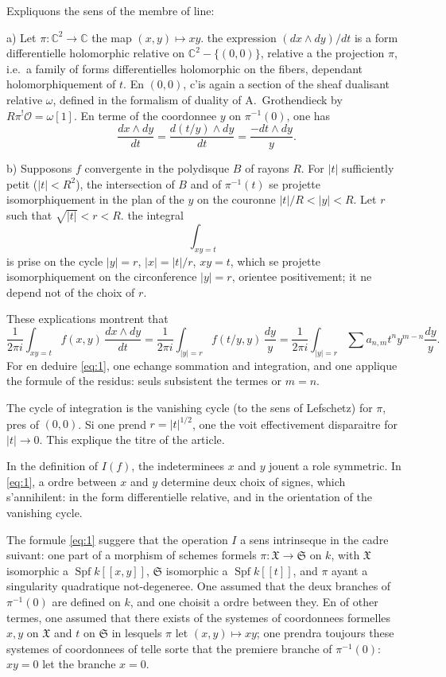 \documentclass[12pt,a4paper]{article}
\theoremstyle{plain}
\theoremstyle{definition}
\theoremstyle{remark}
\DeclareMathOperator{\Spf}{Spf}
\newcommand{\CC}{\mathbb{C}}
\newcommand{\OO}{\mathcal{O}}
\providecommand{\CC}{\mathbb{C}}
\begin{document}
Expliquons the sens of the membre of line:

a) Let $\pi:\CC^2\to\CC$ the map $(x,y)\mapsto xy$. the expression
$(dx\wedge dy)/dt$ is a form differentielle holomorphic relative on
$\CC^2-\{(0,0)\}$, relative a the projection $\pi$, i.e.\ a family of forms
differentielles holomorphic on the fibers, dependant holomorphiquement of $t$.
En $(0,0)$, c'is again a section of the sheaf dualisant relative $\omega$, defined
in the formalism of duality of A.\ Grothendieck by
$R\pi^!\OO=\omega[1]$. En terme of the coordonnee $y$ on $\pi^{-1}(0)$, one has
\[
\frac{dx\wedge dy}{dt}=\frac{d(t/y)\wedge dy}{dt}=\frac{-dt\wedge dy}{y}.
\]

b) Supposons $f$ convergente in the polydisque $B$ of rayons $R$. For $|t|$
sufficiently petit ($|t|<R^2$), the intersection of $B$ and of $\pi^{-1}(t)$ se projette
isomorphiquement in the plan of the $y$ on the couronne $|t|/R<|y|<R$. Let $r$
such that $\sqrt{|t|}<r<R$. the integral
\[
\int_{xy=t}
\]
is prise on the cycle $|y|=r$, $|x|=|t|/r$, $xy=t$, which se projette
isomorphiquement on the circonference $|y|=r$, orientee positivement; it ne
depend not of the choix of $r$.

These explications montrent that
\[
\frac{1}{2\pi i}\int_{xy=t} f(x,y)\,\frac{dx\wedge dy}{dt}
=\frac{1}{2\pi i}\int_{|y|=r} f(t/y,y)\,\frac{dy}{y}
=\frac{1}{2\pi i}\int_{|y|=r}\sum a_{n,m}t^n y^{m-n}\frac{dy}{y}.
\]
For en deduire \eqref{eq:1}, one echange sommation and integration, and one applique the
formule of the residus: seuls subsistent the termes or $m=n$.

The cycle of integration is the vanishing cycle (to the sens of Lefschetz) for $\pi$,
pres of $(0,0)$. Si one prend $r=|t|^{1/2}$, one the voit effectivement disparaitre for
$|t|\to 0$. This explique the titre of the article.

In the definition of $I(f)$, the indeterminees $x$ and $y$ jouent a role
symmetric. In \eqref{eq:1}, a ordre between $x$ and $y$ determine deux choix of signes, which
s'annihilent: in the form differentielle relative, and in the orientation of the vanishing cycle.

The formule \eqref{eq:1} suggere that the operation $I$ a sens intrinseque in the cadre
suivant: one part of a morphism of schemes formels $\pi:\mathfrak{X}\to\mathfrak{S}$ on
$k$, with $\mathfrak{X}$ isomorphic a $\Spf k[[x,y]]$, $\mathfrak{S}$ isomorphic a
$\Spf k[[t]]$, and $\pi$ ayant a singularity quadratique not-degeneree. One assumed that
the deux branches of $\pi^{-1}(0)$ are defined on $k$, and one choisit a ordre between
they. En of other termes, one assumed that there exists of the systemes of coordonnees formelles
$x,y$ on $\mathfrak{X}$ and $t$ on $\mathfrak{S}$ in lesquels $\pi$ let
$(x,y)\mapsto xy$; one prendra toujours these systemes of coordonnees of telle sorte that the
premiere branche of $\pi^{-1}(0)$: $xy=0$ let the branche $x=0$.
\end{document}
